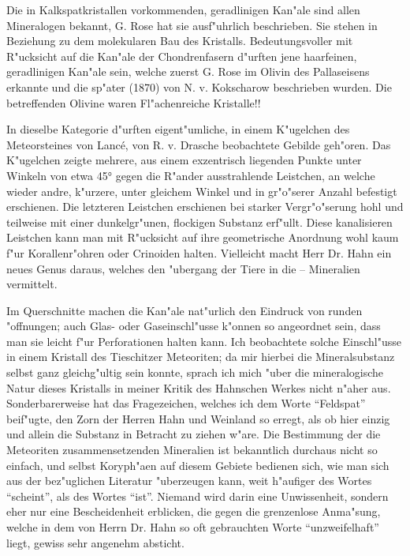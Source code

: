 \documentclass[a4paper, 12pt, oneside]{article}
\begin{document}
Die in Kalkspatkristallen vorkommenden, geradlinigen Kan"ale sind allen Mineralogen bekannt, G. Rose hat sie ausf"uhrlich beschrieben. Sie stehen in Beziehung zu dem molekularen Bau des Kristalls. Bedeutungsvoller mit R"ucksicht auf die Kan"ale der Chondrenfasern d"urften jene haarfeinen, geradlinigen Kan"ale sein, welche zuerst G. Rose im Olivin des Pallaseisens erkannte und die sp"ater (1870) von N. v. Kokscharow beschrieben wurden. Die betreffenden Olivine waren Fl"achenreiche Kristalle!!

In dieselbe Kategorie d"urften eigent"umliche, in einem K"ugelchen des Meteorsteines von Lancé, von R. v. Drasche beobachtete Gebilde geh"oren. Das K"ugelchen zeigte mehrere, aus einem exzentrisch liegenden Punkte unter Winkeln von etwa 45° gegen die R"ander ausstrahlende Leistchen, an welche wieder andre, k"urzere, unter gleichem Winkel und in gr"o"serer Anzahl befestigt erschienen. Die letzteren Leistchen erschienen bei starker Vergr"o"serung hohl und teilweise mit einer dunkelgr"unen, flockigen Substanz erf"ullt. Diese kanalisieren Leistchen kann man mit R"ucksicht auf ihre geometrische Anordnung wohl kaum f"ur Korallenr"ohren oder Crinoiden halten. Vielleicht macht Herr Dr. Hahn ein neues Genus daraus, welches den "ubergang der Tiere in die – Mineralien vermittelt.

Im Querschnitte machen die Kan"ale nat"urlich den Eindruck von runden "offnungen; auch Glas- oder Gaseinschl"usse k"onnen so angeordnet sein, dass man sie leicht f"ur Perforationen halten kann. Ich beobachtete solche Einschl"usse in einem Kristall des Tieschitzer Meteoriten; da mir hierbei die Mineralsubstanz selbst ganz gleichg"ultig sein konnte, sprach ich mich "uber die mineralogische Natur dieses Kristalls in meiner Kritik des Hahnschen Werkes nicht n"aher aus. Sonderbarerweise hat das Fragezeichen, welches ich dem Worte "`Feldspat"' beif"ugte, den Zorn der Herren Hahn und Weinland so erregt, als ob hier einzig und allein die Substanz in Betracht zu ziehen w"are. Die Bestimmung der die Meteoriten zusammensetzenden Mineralien ist bekanntlich durchaus nicht so einfach, und selbst Koryph"aen auf diesem Gebiete bedienen sich, wie man sich aus der bez"uglichen Literatur "uberzeugen kann, weit h"aufiger des Wortes "`scheint"', als des Wortes "`ist"'. Niemand wird darin eine Unwissenheit, sondern eher nur eine Bescheidenheit erblicken, die gegen die grenzenlose Anma"sung, welche in dem von Herrn Dr. Hahn so oft gebrauchten Worte "`unzweifelhaft"' liegt, gewiss sehr angenehm absticht.
\end{document}
